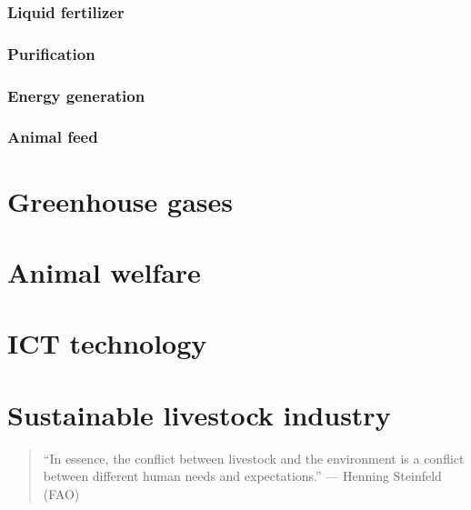 \documentclass[]{book}
\begin{document}
\subsection{Liquid fertilizer}\label{liquid-fertilizer}

\subsection{Purification}\label{purification}

\subsection{Energy generation}\label{energy-generation}

\subsection{Animal feed}\label{animal-feed}

\chapter{Greenhouse gases}\label{greenhouse-gases}

\chapter{Animal welfare}\label{animal-welfare}

\chapter{ICT technology}\label{ict-technology}

\chapter{Sustainable livestock
industry}\label{sustainable-livestock-industry}

\begin{quote}
``In essence, the conflict between livestock and the environment is a
conflict between different human needs and expectations.'' --- Henning
Steinfeld (FAO)
\end{quote}


\end{document}

